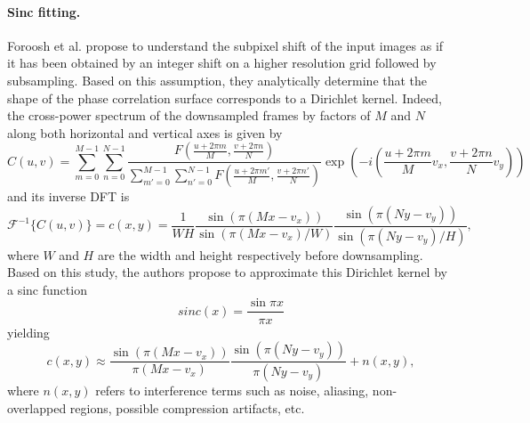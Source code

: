 \paragraph{Sinc fitting.}
Foroosh et al. \cite{Shekarforoush_96, Foroosh2002} propose to understand the subpixel shift of the input images as if it has been obtained by an integer shift on a higher resolution grid followed by subsampling. Based on this assumption, they analytically determine that the shape of the phase correlation surface corresponds to a Dirichlet kernel. Indeed, the cross-power spectrum of the downsampled frames by factors of $M$ and $N$ along both horizontal and vertical axes is given by
\begin{equation}
C(u,v) = \sum_{m=0}^{M-1}\sum_{n=0}^{N-1}\frac{F(\frac{u+2\pi m}{M},\frac{v+2\pi n}{N})}{\sum_{m'=0}^{M-1}\sum_{n'=0}^{N-1}F(\frac{u+2\pi m'}{M},\frac{v+2\pi n'}{N})} \exp\left(-i\left(\frac{u+2\pi m}{M}v_x,\frac{v+2\pi n}{N}v_y\right)\right)
\end{equation}
and its inverse DFT is
\begin{equation}
\mathcal{F}^{-1}\bigg\{C(u,v)\bigg\} = c(x,y) = \frac{1}{WH}\frac{\sin(\pi(Mx - v_x))}{\sin(\pi(Mx - v_x)/W)}\frac{\sin(\pi(Ny - v_y))}{\sin(\pi(Ny-v_y)/H)},
\end{equation}
where $W$ and $H$ are the width and height respectively before downsampling. Based on this study, the authors propose to approximate this Dirichlet kernel by a sinc function
\begin{equation}
sinc(x) = \frac{\sin \pi x}{\pi x}
\end{equation}
yielding 
\begin{equation}
c(x,y) \approx \frac{\sin(\pi(Mx - v_x))}{\pi(Mx - v_x)}\frac{\sin(\pi(Ny - v_y))}{\pi(Ny-v_y)} + n(x,y),
\label{eq:sincPhaseCorrelation}
\end{equation}
where $n(x,y)$ refers to interference terms such as noise, aliasing, non-overlapped regions, possible compression artifacts, etc.


